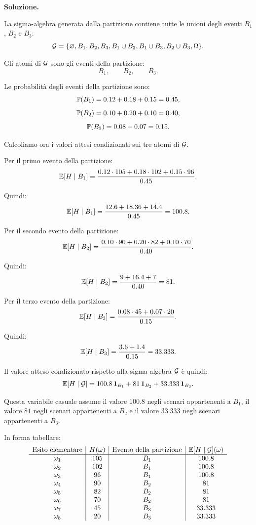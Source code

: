 \noindent
\textbf{Soluzione.}

La sigma-algebra generata dalla partizione contiene tutte le unioni degli
eventi $B_1$, $B_2$ e $B_3$:
\[
\mathcal{G}
=
\{
\varnothing,
B_1,
B_2,
B_3,
B_1\cup B_2,
B_1\cup B_3,
B_2\cup B_3,
\Omega
\}.
\]

Gli atomi di $\mathcal{G}$ sono gli eventi della partizione:
\[
B_1,
\qquad
B_2,
\qquad
B_3.
\]

Le probabilit\`{a} degli eventi della partizione sono:
\[
\mathbb{P}(B_1)
=
0.12+0.18+0.15
=
0.45,
\]
\[
\mathbb{P}(B_2)
=
0.10+0.20+0.10
=
0.40,
\]
\[
\mathbb{P}(B_3)
=
0.08+0.07
=
0.15.
\]

Calcoliamo ora i valori attesi condizionati sui tre atomi di $\mathcal{G}$.

Per il primo evento della partizione:
\[
\mathbb{E}[H\mid B_1]
=
\frac{
0.12\cdot105
+
0.18\cdot102
+
0.15\cdot96
}
{0.45}.
\]

Quindi:
\[
\mathbb{E}[H\mid B_1]
=
\frac{12.6+18.36+14.4}{0.45}
=
100.8.
\]

Per il secondo evento della partizione:
\[
\mathbb{E}[H\mid B_2]
=
\frac{
0.10\cdot90
+
0.20\cdot82
+
0.10\cdot70
}
{0.40}.
\]

Quindi:
\[
\mathbb{E}[H\mid B_2]
=
\frac{9+16.4+7}{0.40}
=
81.
\]

Per il terzo evento della partizione:
\[
\mathbb{E}[H\mid B_3]
=
\frac{
0.08\cdot45
+
0.07\cdot20
}
{0.15}.
\]

Quindi:
\[
\mathbb{E}[H\mid B_3]
=
\frac{3.6+1.4}{0.15}
=
33.333.
\]

Il valore atteso condizionato rispetto alla sigma-algebra $\mathcal{G}$ \`{e}
quindi:
\[
\mathbb{E}[H\mid\mathcal{G}]
=
100.8\,\mathbf{1}_{B_1}
+
81\,\mathbf{1}_{B_2}
+
33.333\,\mathbf{1}_{B_3}.
\]

Questa variabile casuale assume il valore $100.8$ negli scenari appartenenti
a $B_1$, il valore $81$ negli scenari appartenenti a $B_2$ e il valore
$33.333$ negli scenari appartenenti a $B_3$.

In forma tabellare:
\[
\begin{array}{c|c|c|c}
\text{Esito elementare} & H(\omega) & \text{Evento della partizione}
& \mathbb{E}[H\mid\mathcal{G}](\omega) \\
\hline
\omega_1 & 105 & B_1 & 100.8 \\
\omega_2 & 102 & B_1 & 100.8 \\
\omega_3 & 96  & B_1 & 100.8 \\
\omega_4 & 90  & B_2 & 81 \\
\omega_5 & 82  & B_2 & 81 \\
\omega_6 & 70  & B_2 & 81 \\
\omega_7 & 45  & B_3 & 33.333 \\
\omega_8 & 20  & B_3 & 33.333 \\
\end{array}
\]


